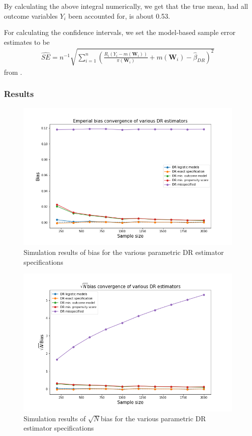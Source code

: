 \documentclass[12pt,twoside]{article}
\begin{document}
By calculating the above integral numerically, we get that the true mean, had all outcome variables $Y_i$ been accounted for, is about 0.53.

For calculating the confidence intervals, we set the model-based sample error estimates to be 
\begin{align*}
    \hat{SE} = n^{-1} \sqrt{\sum_{i=1}^n \left(\frac{R_i(Y_i - m(\mathbf{W}_i))}{\pi(\mathbf{W}_i)} + m(\mathbf{W}_i) - \hat{\beta}_{DR}\right)^2}
\end{align*}
from \citet{lunceford_davidian}. \\

\subsubsection*{Results}

\begin{figure}[h!]
    \centering
    \includegraphics[width = 0.9\columnwidth]{figures/biaspara.png}
    \caption{Simulation results of bias for the various parametric DR estimator specifications}
    \label{figbiaspara}
\end{figure}

\begin{figure}[h!]
    \centering
    \includegraphics[width = 0.9\columnwidth]{figures/sqrtnpara.png}
    \caption{Simulation results of $\sqrt{N}$bias for the various parametric DR estimator specifications}
    \label{figsqrtnpara}
\end{figure}
\end{document}
